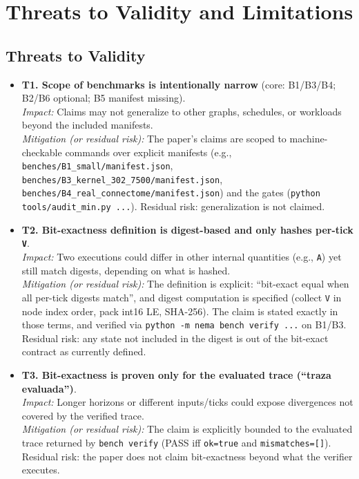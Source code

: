 \section{Threats to Validity and Limitations}

\subsection{Threats to Validity}

\begin{itemize}
\item \textbf{T1. Scope of benchmarks is intentionally narrow} (core: B1/B3/B4; B2/B6 optional; B5 manifest missing).\\
\textit{Impact:} Claims may not generalize to other graphs, schedules, or workloads beyond the included manifests.\\
\textit{Mitigation (or residual risk):} The paper's claims are scoped to machine-checkable commands over explicit manifests (e.g., \texttt{benches/B1\_small/manifest.json}, \texttt{benches/B3\_kernel\_302\_7500/manifest.json}, \texttt{benches/B4\_real\_connectome/manifest.json}) and the gates (\texttt{python tools/audit\_min.py ...}). Residual risk: generalization is not claimed.

\item \textbf{T2. Bit-exactness definition is digest-based and only hashes per-tick \texttt{V}}.\\
\textit{Impact:} Two executions could differ in other internal quantities (e.g., \texttt{A}) yet still match digests, depending on what is hashed.\\
\textit{Mitigation (or residual risk):} The definition is explicit: ``bit-exact equal when all per-tick digests match'', and digest computation is specified (collect \texttt{V} in node index order, pack int16 LE, SHA-256). The claim is stated exactly in those terms, and verified via \texttt{python -m nema bench verify ...} on B1/B3. Residual risk: any state not included in the digest is out of the bit-exact contract as currently defined.

\item \textbf{T3. Bit-exactness is proven only for the evaluated trace (``traza evaluada'')}.\\
\textit{Impact:} Longer horizons or different inputs/ticks could expose divergences not covered by the verified trace.\\
\textit{Mitigation (or residual risk):} The claim is explicitly bounded to the evaluated trace returned by \texttt{bench verify} (PASS iff \texttt{ok=true} and \texttt{mismatches=[]}). Residual risk: the paper does not claim bit-exactness beyond what the verifier executes.


\end{itemize}
